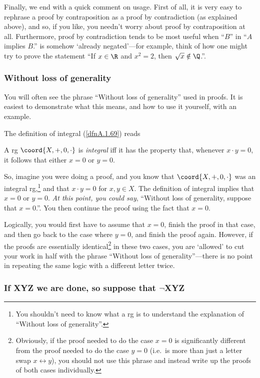 Finally, we end with a quick comment on usage.  First of all, it is very easy to rephrase a proof by contraposition as a proof by contradiction (as explained above), and so, if you like, you needn't worry about proof by contraposition at all.  Furthermore, proof by contradiction tends to be most useful when ``$B$'' in ``$A$ implies $B$.'' is somehow `already negated'---for example, think of how one might try to prove the statement ``If $x\in \R$ and $x^2=2$, then $\sqrt{x}\notin \Q$.''. 

\subsubsection{Without loss of generality\textellipsis}

You will often see the phrase ``Without loss of generality\textellipsis'' used in proofs.  It is easiest to demonstrate what this means, and how to use it yourself, with an example.

The definition of integral (\cref{dfnA.1.69}) reads
\begin{important}
A rg $\coord{X,+,0,\cdot}$ is \emph{integral} iff it has the property that, whenever $x\cdot y=0$, it follows that either $x=0$ or $y=0$.
\end{important}
So, imagine you were doing a proof, and you know that $\coord{X,+,0,\cdot}$ was an integral rg,\footnote{You shouldn't need to know what a rg is to understand the explanation of ``Without loss of generality\textellipsis ''.} and that $x\cdot y=0$ for $x,y\in X$.  The definition of integral implies that $x=0$ or $y=0$.  \emph{At this point, you could say}, ``Without loss of generality, suppose that $x=0$.''.  You then continue the proof using the fact that $x=0$.

Logically, you would first have to assume that $x=0$, finish the proof in that case, and then go back to the case where $y=0$, and finish the proof again.  However, if the proofs are essentially identical\footnote{Obviously, if the proof needed to do the case $x=0$ is significantly different from the proof needed to do the case $y=0$ (i.e.~is more than just a letter swap $x\leftrightarrow y$), you should not use this phrase and instead write up the proofs of both cases individually.} in these two cases, you are `allowed' to cut your work in half with the phrase ``Without loss of generality\textellipsis ''---there is no point in repeating the same logic with a different letter twice.

\subsubsection{If XYZ we are done, so suppose that \texorpdfstring{$\neg$}{not}XYZ}

